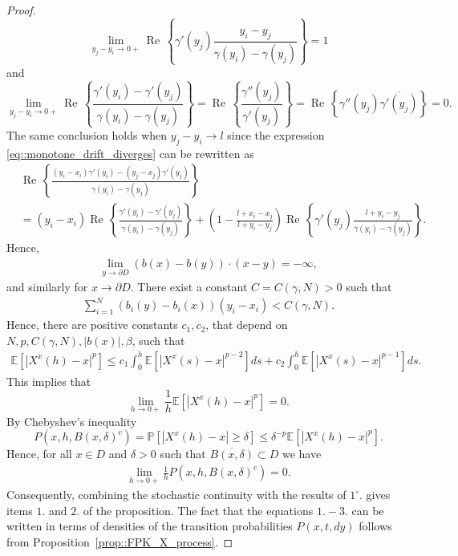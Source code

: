\documentclass[11pt]{article}
\renewcommand{\Re}{\operatorname{Re}\,}
\numberwithin{equation}{section}
\theoremstyle{definition}
\begin{document}
\begin{proof}
\[
    \lim\limits_{y_{j}-y_{i}\to 0+}\Re\left\{\gamma'(y_{j})\frac{y_{i}-y_{j}}{\gamma(y_{i})-\gamma(y_{j})}\right\} = 1
\]
and 
\[
     \lim\limits_{y_{j}-y_{i}\to 0+}  \Re\left\{\frac{\gamma'(y_{i})-\gamma'(y_{j})}{\gamma(y_{i})-\gamma(y_{j})}\right\} 
     = \Re\left\{\frac{\gamma''(y_{j})}{\gamma'(y_{j})}\right\} 
     =  \Re\left\{\gamma''(y_{j}) \overline{\gamma'(y_{j})}\right\} 
     =0.
\]
The same conclusion holds when $y_{j}-y_{i}\to l$ since the expression \eqref{eq::monotone_drift_diverges} can be rewritten as
\begin{align*}
    &\Re\left\{\frac{(y_{i}-x_{i})\gamma'(y_{i})-(y_{j}-x_{j})\gamma'(y_{j})}{\gamma(y_{i})-\gamma(y_{j})}\right\} \\
    &= (y_{i}-x_{i})\Re\left\{\frac{\gamma'(y_{i})-\gamma'(y_{j})}{\gamma(y_{i})-\gamma(y_{j})}\right\}+ \left(1 - \frac{l+x_{i}-x_{j}}{l+y_{i}-y_{j}}\right)\Re\left\{\gamma'(y_{j})\frac{l+y_{i}-y_{j}}{\gamma(y_{i})-\gamma(y_{j})}\right\}.
\end{align*}
Hence, 
\begin{align*}
    \lim\limits_{y\to \partial D}(b(x)-b(y))\cdot (x-y)= -\infty,
\end{align*}
and similarly for $x\to\partial D$. There exist a constant $C=C(\gamma, N)>0$ such that 
\begin{align*}
    \sum\limits_{i=1}^{N}(b_{i}(y)-b_{i}(x))(y_{i}-x_{i}) < C(\gamma, N).
\end{align*}
Hence, there are positive constants $c_{1},c_{2}$, that depend on $N,p, C(\gamma, N), |b(x)|, \beta $, such that 
\begin{align*}
    \mathbb{E}\left[|X^{x}(h)-x|^{p}\right] 
    \le c_{1} \int_{0}^{h}\mathbb{E}\left[|X^{x}(s)-x|^{p-2}\right]ds 
    + c_{2} \int_{0}^{h}\mathbb{E}\left[|X^{x}(s)-x|^{p-1}\right]ds.
\end{align*}
This implies that 
\[
    \lim\limits_{h\to 0+}\frac{1}{h}\mathbb{E}\left[|X^{x}(h)-x|^{p}\right] =0.
\]
By Chebyshev's inequality
\[
    P(x,h,B(x,\delta)^{c}) 
    = \mathbb{P}[|X^{x}(h)-x|\ge \delta]
    \le \delta^{-p}\mathbb{E}\left[|X^{x}(h)-x|^{p}\right].
\]
Hence, for all $x\in D$ and $\delta > 0$ such that $\overline{B(x,\delta)}\subset D$ we have
\begin{align*}
    \lim\limits_{h\to 0+}\frac{1}{h}P(x,h,B(x,\delta)^{c})=0.
\end{align*}
Consequently, combining the stochastic continuity with the results of $1^{\circ}.$ gives items $1.$ and $2.$ of the proposition. The fact that the equations $1.-3.$ can be written in terms of densities of the transition probabilities $P(x,t,dy)$ follows from Proposition~\ref{prop::FPK_X_process}.
\end{proof}
\end{document}
